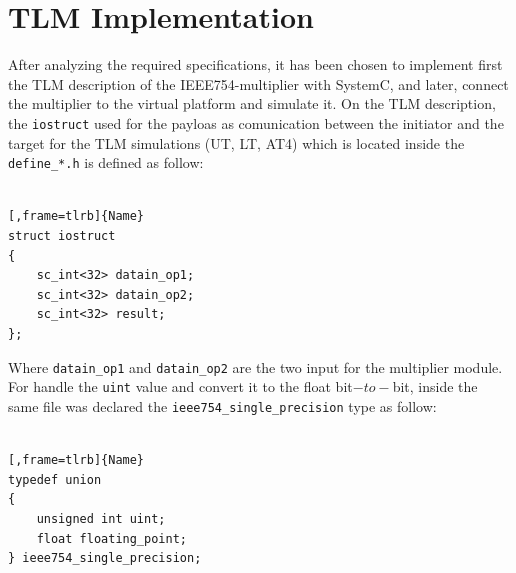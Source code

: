 \documentclass[]{IEEEtran}
\begin{document}
\begin{center}


	
	\end{center}

	
	\section{TLM Implementation}
	\label{sec:impl}
		After analyzing the required specifications, it has been chosen to implement first the TLM description of the IEEE754-multiplier with SystemC, and later, connect the multiplier to the virtual platform and simulate it.
		On the TLM description, the \verb|iostruct| used for the payloas as comunication between the initiator and the target for the TLM simulations (UT, LT, AT4) which is located inside the \verb|define_*.h| is defined as follow:
		\\
		\\
		\noindent
		\begin{minipage}{.45\textwidth}
			\begin{lstlisting}[,frame=tlrb]{Name}
struct iostruct 
{
	sc_int<32> datain_op1;
	sc_int<32> datain_op2;
	sc_int<32> result;
};
			\end{lstlisting}
		\end{minipage}\hfill
		Where \verb|datain_op1| and  \verb|datain_op2| are the two input for the multiplier module. For handle the \verb|uint| value and convert it to the float bit$-to-$bit, inside the same file was declared the \verb|ieee754_single_precision| type as follow:
				\\
		\\
		\noindent
		\begin{minipage}{.45\textwidth}
			\begin{lstlisting}[,frame=tlrb]{Name}
typedef union 
{
	unsigned int uint;
	float floating_point;
} ieee754_single_precision;
			\end{lstlisting}
		\end{minipage}\hfill
\end{document}
